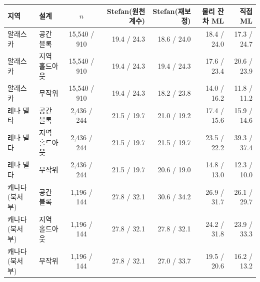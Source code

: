 \begin{tabular}{@{}llcrrrr@{}}
\toprule
지역 & 설계 & $n$ & Stefan(원천 계수) & Stefan(재보정) & 물리 잔차 ML & 직접 ML \\
\midrule
알래스카 & 공간 블록 & 15,540 / 910 & 19.4 / 24.3 & 18.6 / 24.0 & 18.4 / 24.0 & 17.3 / 24.7 \\
알래스카 & 지역 홀드아웃 & 15,540 / 910 & 19.4 / 24.3 & 19.4 / 24.3 & 17.6 / 23.4 & 20.6 / 23.9 \\
알래스카 & 무작위 & 15,540 / 910 & 19.4 / 24.3 & 18.2 / 23.8 & 14.0 / 16.2 & 11.8 / 11.2 \\
레나 델타 & 공간 블록 & 2,436 / 244 & 21.5 / 19.7 & 21.0 / 19.2 & 17.4 / 15.6 & 15.9 / 14.6 \\
레나 델타 & 지역 홀드아웃 & 2,436 / 244 & 21.5 / 19.7 & 21.5 / 19.7 & 23.5 / 22.2 & 39.3 / 37.4 \\
레나 델타 & 무작위 & 2,436 / 244 & 21.5 / 19.7 & 20.6 / 19.0 & 14.8 / 13.0 & 12.3 / 10.0 \\
캐나다(북서부) & 공간 블록 & 1,196 / 144 & 27.8 / 32.1 & 30.6 / 34.2 & 26.9 / 31.7 & 26.1 / 29.7 \\
캐나다(북서부) & 지역 홀드아웃 & 1,196 / 144 & 27.8 / 32.1 & 27.8 / 32.1 & 24.2 / 31.8 & 23.9 / 33.3 \\
캐나다(북서부) & 무작위 & 1,196 / 144 & 27.8 / 32.1 & 27.0 / 33.7 & 19.5 / 20.6 & 16.2 / 13.2 \\
\bottomrule
\end{tabular}
